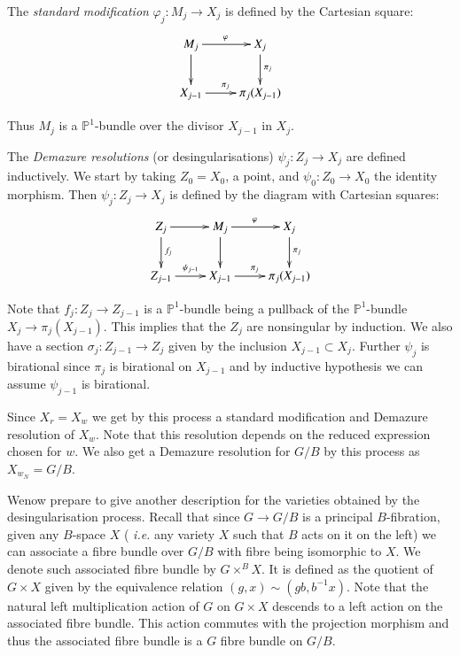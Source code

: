 The {\em standard modification} $\varphi_{j}:M_{j}\to X_{j}$ is
defined by the Cartesian square:
\[
\xymatrix{
M_{j}\ar[d]\ar[r]^{\varphi} & X_{j}\ar[d]^{\pi_{j}}\\
X_{j-1}\ar[r]^{\pi_{j}} & \pi_{j}(X_{j-1})
}
\]

Thus $M_{j}$ is a $\mathbb{P}^{1}$-bundle over the
divisor $X_{j-1}$
in $X_{j}$.

The {\em Demazure resolutions} (or
desingularisations) 
$\psi_{j}:Z_{j}\to X_{j}$ are defined inductively. We start by taking
$Z_{0}=X_{0}$, a point, and $\psi_{0}:Z_{0}\to X_{0}$ the identity
morphism. Then $\psi_{j}:Z_{j}\to X_{j}$ is defined by the diagram
with Cartesian squares:
\[
\xymatrix{
Z_{j}\ar[d]^{f_{j}}\ar[r] & M_{j}\ar[d]\ar[r]^{\varphi} &
X_{j}\ar[d]^{\pi_{j}}\\
Z_{j-1}\ar[r]^{\psi_{j-1}} & X_{j-1}\ar[r]^{\pi_{j}} & \pi_{j}(X_{j-1})
}
\]

Note that $f_{j}:Z_{j}\to Z_{j-1}$ is a $\mathbb{P}^{1}$-bundle being
a pullback of the $\mathbb{P}^{1}$-bundle $X_{j}\to
\pi_{j}(X_{j-1})$. This implies that the $Z_{j}$ are nonsingular by
induction. We also have a section $\sigma_{j}:Z_{j-1}\to Z_{j}$ given
by the inclusion $X_{j-1}\subset X_{j}$. Further $\psi_{j}$ is
birational since $\pi_{j}$ is birational on $X_{j-1}$ and by inductive
hypothesis we can assume $\psi_{j-1}$ is birational.

Since $X_{r}=X_{w}$ we get by this process a standard modification and
Demazure resolution of $X_{w}$. Note that this resolution depends on
the reduced expression chosen for $w$. We also get a Demazure
resolution for $G/B$ by this process as $X_{w_{N}}=G/B$.

We\pageoriginale now prepare to give another description for the
varieties obtained by the desingularisation process. Recall that since
$G\to G/B$ is a principal $B$-fibration, given any $B$-space $X$ ({\em
  i.e.} any variety $X$ such that $B$ acts on it on the left) we can
associate a fibre bundle over $G/B$ with fibre being isomorphic to
$X$. We denote such associated fibre 
bundle by $G\times^{B}X$. It is
defined as the quotient of $G\times X$ given by the equivalence
relation $(g,x)\sim (gb,b^{-1}x)$. Note that the natural left
multiplication action of $G$ on $G\times X$ descends to a left action
on the associated fibre bundle. This action commutes with the
projection morphism and thus the associated fibre bundle is a $G$
fibre bundle on $G/B$.

